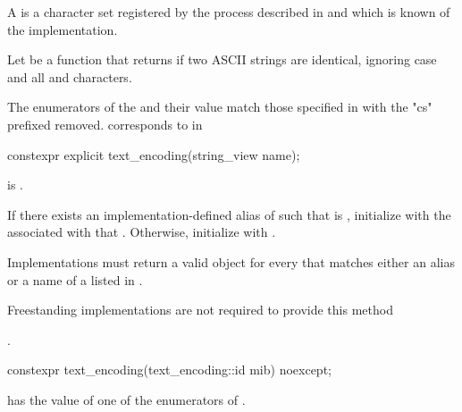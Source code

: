 \documentclass{wg21}
\begin{document}
\begin{addedblock}

\pnum A  is a character set registered by the process described in \cite{rfc2978} and which is known of the implementation.

\pnum Let  be a function that returns  if two ASCII strings are identical, ignoring case and all \tcode{-} and  \tcode{_} characters.

\begin{note}
The enumerators of the  and their value match those specified in \cite{rfc3808} with the "cs" prefixed removed.  corresponds to  in \cite{rfc3808}
\end{note}

\begin{itemdecl}
constexpr explicit text_encoding(string_view name);
\end{itemdecl}

\begin{itemdescr}
    \preconditions {} is .
    
    \effects
    If there exists an implementation-defined alias  of  such that  is , initialize
     with the  associated with that . Otherwise, initialize  with .

    Implementations must return a valid  object for every  that matches either an alias or a name of a  listed in \cite{rfc3808}.

\begin{note}
	Freestanding implementations are not required to provide this method
\end{note}

    \postconditions {}.
\end{itemdescr}


\begin{itemdecl}
constexpr text_encoding(text_encoding::id mib) noexcept;
\end{itemdecl}

\begin{itemdescr}
    \preconditions {}  has the value of one of the enumerators of .
    

\end{itemdescr}
\end{addedblock}
\end{document}
